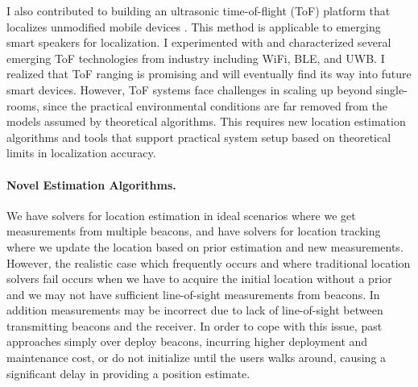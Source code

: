 \documentclass[10pt]{article}
\begin{document}
I also contributed to building an ultrasonic time-of-flight (ToF) platform that localizes unmodified mobile devices \cite{rtas-alps-platform, lazik2015alps,lazik2015alpsdemo}. This method is applicable to emerging smart speakers for localization. I experimented with and characterized several emerging ToF technologies from industry including WiFi, BLE, and UWB. %
I realized that ToF ranging is promising and will eventually find its way into future smart devices.  However, ToF systems face challenges in scaling up beyond single-rooms, since the practical environmental conditions are far removed from the models assumed by theoretical algorithms. This requires new location estimation algorithms and tools that support practical system setup based on theoretical limits in localization accuracy. %


\paragraph{Novel Estimation Algorithms. } 
We have solvers for location estimation in ideal scenarios where we get measurements from multiple beacons, and have solvers for location tracking where we update the location based on prior estimation and new measurements. However, the realistic case which frequently occurs and where traditional location solvers fail occurs when we have to acquire the initial location without a prior and we may not have sufficient line-of-sight measurements from beacons. In addition measurements may be incorrect due to lack of line-of-sight between transmitting beacons and the receiver. In order to cope with this issue, past approaches simply over deploy beacons, incurring higher deployment and maintenance cost, or do not initialize until the users walks around, causing a significant delay in providing a position estimate.
\end{document}
